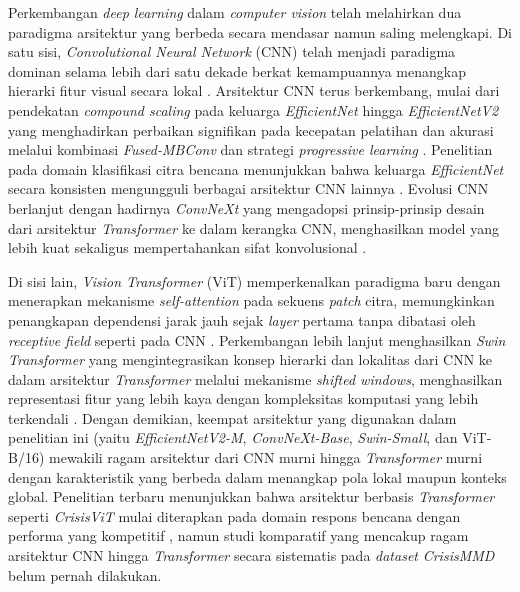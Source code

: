 Perkembangan \textit{deep learning} dalam \textit{computer vision}
telah melahirkan dua paradigma arsitektur yang berbeda secara mendasar
namun saling melengkapi. Di satu sisi, \textit{Convolutional Neural
Network} (CNN) telah menjadi paradigma dominan selama lebih dari satu
dekade berkat kemampuannya menangkap hierarki fitur visual secara lokal
\cite{lecun1998gradient}\cite{linardos2022deep}. Arsitektur CNN terus
berkembang, mulai dari pendekatan \textit{compound scaling} pada
keluarga \textit{EfficientNet} \cite{tan2019efficientnet} hingga
\textit{EfficientNetV2} yang menghadirkan perbaikan signifikan pada
kecepatan pelatihan dan akurasi melalui kombinasi \textit{Fused-MBConv}
dan strategi \textit{progressive learning} \cite{tan2021efficientnetv2}.
Penelitian pada domain klasifikasi citra bencana menunjukkan bahwa
keluarga \textit{EfficientNet} secara konsisten mengungguli berbagai
arsitektur CNN lainnya \cite{alam2021robust}. Evolusi CNN berlanjut
dengan hadirnya \textit{ConvNeXt} yang mengadopsi prinsip-prinsip
desain dari arsitektur \textit{Transformer} ke dalam kerangka CNN,
menghasilkan model yang lebih kuat sekaligus mempertahankan sifat
konvolusional \cite{liu2022convnext}. \par

Di sisi lain, \textit{Vision Transformer} (ViT) memperkenalkan
paradigma baru dengan menerapkan mekanisme \textit{self-attention} pada
sekuens \textit{patch} citra, memungkinkan penangkapan dependensi jarak
jauh sejak \textit{layer} pertama tanpa dibatasi oleh \textit{receptive
field} seperti pada CNN \cite{dosovitskiy2021image}. Perkembangan lebih
lanjut menghasilkan \textit{Swin Transformer} yang mengintegrasikan
konsep hierarki dan lokalitas dari CNN ke dalam arsitektur
\textit{Transformer} melalui mekanisme \textit{shifted windows},
menghasilkan representasi fitur yang lebih kaya dengan kompleksitas
komputasi yang lebih terkendali \cite{liu2021swin}. Dengan demikian,
keempat arsitektur yang digunakan dalam penelitian ini (yaitu
\textit{EfficientNetV2-M}, \textit{ConvNeXt-Base}, \textit{Swin-Small},
dan ViT-B/16) mewakili ragam arsitektur dari CNN murni hingga
\textit{Transformer} murni dengan karakteristik yang berbeda dalam
menangkap pola lokal maupun konteks global. Penelitian terbaru
menunjukkan bahwa arsitektur berbasis \textit{Transformer} seperti
\textit{CrisisViT} mulai diterapkan pada domain respons bencana dengan
performa yang kompetitif \cite{long2023crisisvit}, namun studi
komparatif yang mencakup ragam arsitektur CNN hingga \textit{Transformer}
secara sistematis pada \textit{dataset} \textit{CrisisMMD} belum pernah
dilakukan. \par

